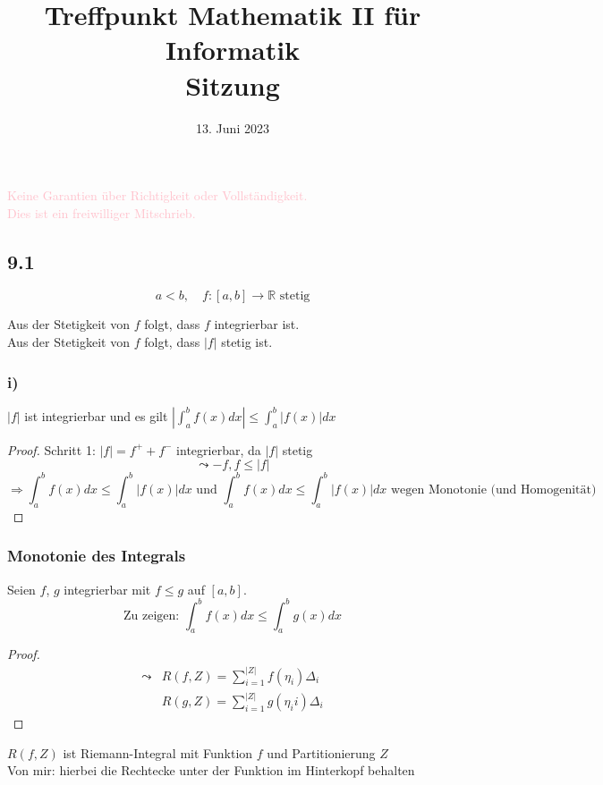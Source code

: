\documentclass[
    accentcolor=pink,
    boxarc,
    dark_mode,
    logofile=enmpty
]{rubos-tuda-template}
\date{13. Juni 2023}
\title[trans rights <3]{Treffpunkt Mathematik II für Informatik \\ Sitzung \getSheetnumber{}}
\begin{document}
    \maketitle{}
    \begin{anmerkung}
        \huge{\textcolor{pink}{Keine Garantien über Richtigkeit oder Vollständigkeit. \\ Dies ist ein freiwilliger Mitschrieb.}}
    \end{anmerkung}

    \subsection*{9.1}
    \[a < b,\quad f:[a,b] \to \mathbb{R} \text{ stetig}\]
    \begin{anmerkungen}
        Aus der Stetigkeit von $f$ folgt, dass $f$ integrierbar ist.\\
        Aus der Stetigkeit von $f$ folgt, dass $|f|$ stetig ist.
    \end{anmerkungen}

    \subsubsection*{i)}
    $|f|$ ist integrierbar und es gilt
    $\displaystyle{|\int_{a}^{b}f(x)dx| \le \int_{a}^{b}|f(x)|dx}$
    \begin{proof}
        Schritt 1: $|f| = f^+ + f^-$ integrierbar, da $|f|$ stetig
        \[\leadsto -f, f \le |f|\]
        \[\Rightarrow \int_{a}^{b}f(x)dx \le \int_{a}^{b}|f(x)|dx \text{ und } \int_{a}^{b}f(x)dx \le \int_{a}^{b} |f(x)|dx \text{ wegen Monotonie (und Homogenität)}\]
    \end{proof}
    \subsubsection*{Monotonie des Integrals}
    Seien $f$, $g$ integrierbar mit $f \le g$ auf $[a,b]$.
    \[\text{Zu zeigen: } \int_{a}^{b}f(x)dx \le \int_{a}^{b}g(x)dx\]
    \begin{proof}
        \begin{align*}
            \leadsto & R(f, Z) = \sum_{i=1}^{|Z|}f(\eta_i)\Delta_i  \\
                     & R(g, Z) = \sum_{i=1}^{|Z|}g(\eta_ii)\Delta_i
        \end{align*}
    \end{proof}
    \begin{anmerkungen}
        $R(f, Z)$ ist Riemann-Integral mit Funktion $f$ und Partitionierung $Z$\\
        Von mir: hierbei die Rechtecke unter der Funktion im Hinterkopf behalten
    \end{anmerkungen}
\end{document}
